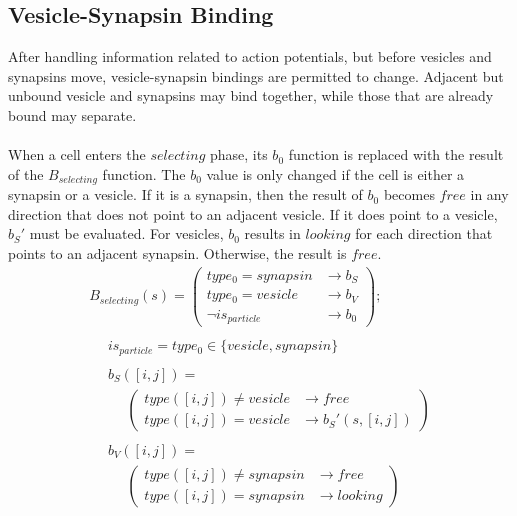 \documentclass{acm_proc_article-sp}
\begin{document}
\subsection{Vesicle-Synapsin Binding} \label{Binding}
After handling information related to action potentials, but before
vesicles and synapsins move, vesicle-synapsin bindings are permitted 
to change.  Adjacent but unbound vesicle and synapsins may bind 
together, while those that are already bound may separate. \\
\\
When a cell enters the $selecting$ phase, its $b_0$ function
is replaced with the result of the $B_{selecting}$ function.
The $b_0$ value is only changed if the cell is either a synapsin
or a vesicle.  If it is a synapsin, then the result of $b_0$ 
becomes $free$ in any direction that does not point to an
adjacent vesicle.  If it does point to a vesicle, $b_S'$ must
be evaluated.  For vesicles, $b_0$ results in $looking$ for each
direction that points to an adjacent synapsin.  Otherwise, the
result is $free$.
\begin{displaymath} \begin{array}{l}
B_{selecting}(s) = \left( \begin{array}{ll} type_0 = synapsin  & \rightarrow b_S \\
                                            type_0 = vesicle   & \rightarrow b_V \\
                                            \neg is_{particle} & \rightarrow b_0 \end{array} \right); \\
\\
\hspace{16pt} is_{particle} = type_0 \in \{ vesicle, synapsin\} \\
\\
\hspace{16pt} b_S([i, j]) = \\
\hspace{16pt} \hspace{16pt} \left( \begin{array}{ll} type([i, j]) \ne vesicle & \rightarrow free \\
                                                     type([i, j]) = vesicle   & \rightarrow b_S'(s, [i, j]) \end{array} \right) \\
\\
\hspace{16pt} b_V([i, j]) = \\
\hspace{16pt} \hspace{16pt} \left( \begin{array}{ll} type([i, j]) \ne synapsin & \rightarrow free \\
                                                     type([i, j]) = synapsin   & \rightarrow looking \end{array} \right)
\end{array} \end{displaymath}
\end{document}
